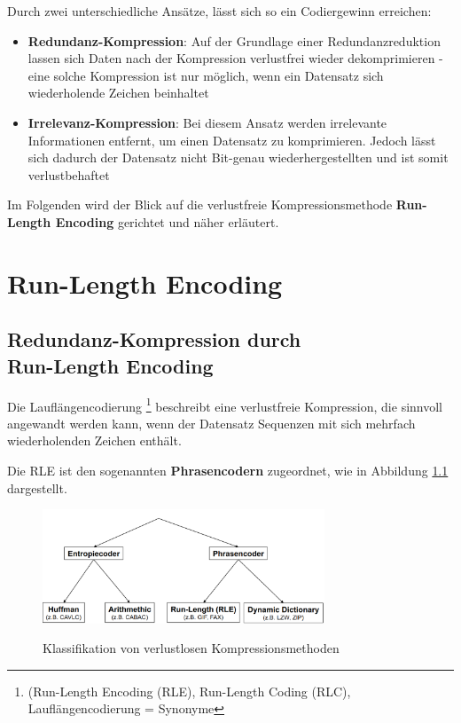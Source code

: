 \documentclass[11pt,a4paper,ngerman]{report}
\begin{document}
		Durch zwei unterschiedliche Ansätze, lässt sich so ein Codiergewinn erreichen:
	
		\begin{itemize}
		\item \textbf{Redundanz-Kompression}: 
		Auf der Grundlage einer Redundanzreduktion lassen sich Daten nach der Kompression verlustfrei wieder dekomprimieren - eine solche Kompression ist nur möglich, wenn ein Datensatz sich wiederholende Zeichen beinhaltet
		
		\item \textbf{Irrelevanz-Kompression}:
		Bei diesem Ansatz werden irrelevante Informationen entfernt, um einen Datensatz zu komprimieren. Jedoch lässt sich dadurch der Datensatz nicht Bit-genau wiederhergestellten und ist somit verlustbehaftet
		\end{itemize}
	
	
		Im Folgenden wird der Blick auf die verlustfreie Kompressionsmethode \textbf{Run-Length Encoding} gerichtet und näher erläutert.
	
	
	\chapter{Run-Length Encoding}	
  		\section{Redundanz-Kompression durch \\ Run-Length Encoding}
  		  Die Lauflängencodierung \footnote{(Run-Length Encoding (RLE), Run-Length Coding (RLC), Lauflängencodierung = Synonyme} beschreibt eine verlustfreie Kompression, die sinnvoll angewandt werden kann, wenn der Datensatz Sequenzen mit sich mehrfach wiederholenden Zeichen enthält.
  		  
  		  
  		  Die RLE ist den sogenannten \textbf{Phrasencodern} zugeordnet, wie in Abbildung \ref{MMK} dargestellt.
  		  
  		  \begin{figure} [H]
  		  	\begin{center}
  		  		\includegraphics[width=0.75\textwidth]{MMK_RLE.png}
  		  		\caption{Klassifikation von verlustlosen Kompressionsmethoden}
  		  		\cite[Seite 8]{MMK}
  		  		\label{MMK}
  		  	\end{center}
  		  \end{figure}
  		  
\end{document}
